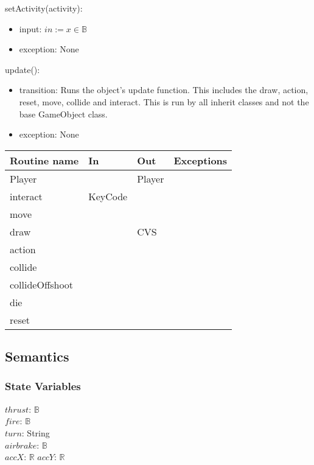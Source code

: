 \documentclass[12pt]{article}
\begin{document}
\noindent setActivity(activity):
\begin{itemize}
    \item input: $in := x \in \mathbb{B}$
    \item exception: None
\end{itemize}

\noindent update():
\begin{itemize}
    \item transition: Runs the object's update function. This includes the draw, action, reset, move, collide and interact. This is run by all inherit classes and not the base GameObject class.
    \item exception: None
\end{itemize}

\newpage

\begin{tabular}{| l | l | l | l |}
    \hline
    \textbf{Routine name} & \textbf{In} & \textbf{Out} & \textbf{Exceptions}\\
    \hline
    Player & ~ & Player & ~\\
    \hline
    interact & KeyCode & ~ & ~\\
    \hline
    move & ~ & ~ & ~\\
    \hline
    draw & ~ & CVS & ~\\
    \hline
    action & ~ & ~ & ~\\
    \hline
    collide & ~ & ~ & ~\\
    \hline
    collideOffshoot & ~ & ~ & ~\\
    \hline
    die & ~ & ~ & ~\\
    \hline
    reset & ~ & ~ & ~\\
    \hline
\end{tabular}

\subsection* {Semantics}

\subsubsection* {State Variables}

$thrust$: $\mathbb{B}$\\
$fire$: $\mathbb{B}$\\
$turn$: String\\
$airbrake$: $\mathbb{B}$\\
$accX$: $\mathbb{R}$
$accY$: $\mathbb{R}$
\end{document}
